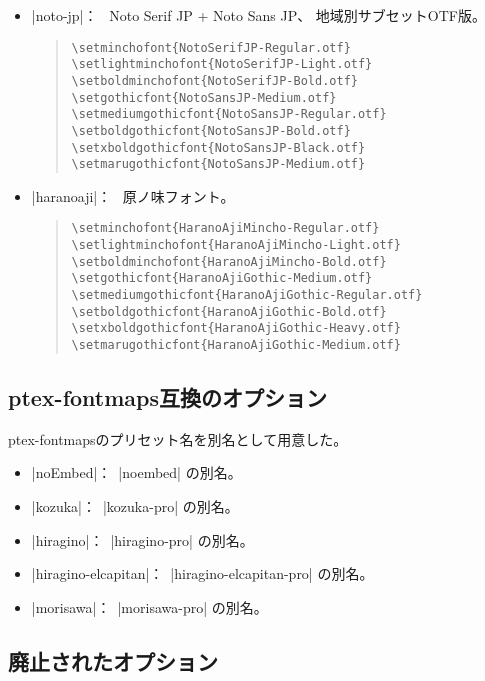 \documentclass[uplatex,dvipdfmx,a4paper]{jsarticle}
\newcommand{\Pkg}[1]{\textsf{#1}}
\newcommand{\Means}{：\ }
\begin{document}
\begin{itemize}
\item |noto-jp|\Means
  Noto Serif JP + Noto Sans JP、
  地域別サブセットOTF版。

\begin{quote}\small\begin{verbatim}
\setminchofont{NotoSerifJP-Regular.otf}
\setlightminchofont{NotoSerifJP-Light.otf}
\setboldminchofont{NotoSerifJP-Bold.otf}
\setgothicfont{NotoSansJP-Medium.otf}
\setmediumgothicfont{NotoSansJP-Regular.otf}
\setboldgothicfont{NotoSansJP-Bold.otf}
\setxboldgothicfont{NotoSansJP-Black.otf}
\setmarugothicfont{NotoSansJP-Medium.otf}
\end{verbatim}\end{quote}

\item |haranoaji|\Means
  原ノ味フォント。

\begin{quote}\small\begin{verbatim}
\setminchofont{HaranoAjiMincho-Regular.otf}
\setlightminchofont{HaranoAjiMincho-Light.otf}
\setboldminchofont{HaranoAjiMincho-Bold.otf}
\setgothicfont{HaranoAjiGothic-Medium.otf}
\setmediumgothicfont{HaranoAjiGothic-Regular.otf}
\setboldgothicfont{HaranoAjiGothic-Bold.otf}
\setxboldgothicfont{HaranoAjiGothic-Heavy.otf}
\setmarugothicfont{HaranoAjiGothic-Medium.otf}
\end{verbatim}\end{quote}

\end{itemize}

\subsection{ptex-fontmaps互換のオプション}

\Pkg{ptex-fontmaps}のプリセット名を別名として用意した。

\begin{itemize}
\item |noEmbed|\Means |noembed| の別名。
\item |kozuka|\Means |kozuka-pro| の別名。
\item |hiragino|\Means |hiragino-pro| の別名。
\item |hiragino-elcapitan|\Means |hiragino-elcapitan-pro| の別名。
\item |morisawa|\Means |morisawa-pro| の別名。
\end{itemize}

\subsection{廃止されたオプション}
\end{document}
